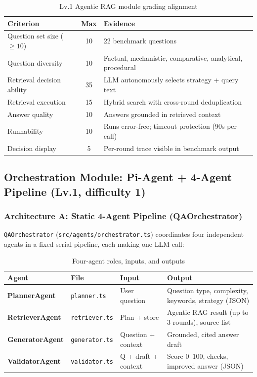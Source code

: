 \documentclass[12pt, a4paper]{article}
\begin{document}
\begin{table}[ht]
\centering
\caption{Lv.1 Agentic RAG module grading alignment}
\begin{tabular}{lcp{7cm}}
\toprule
\textbf{Criterion} & \textbf{Max} & \textbf{Evidence} \\
\midrule
Question set size ($\ge10$) & 10 & 22 benchmark questions \\
Question diversity          & 10 & Factual, mechanistic, comparative, analytical, procedural \\
Retrieval decision ability  & 35 & LLM autonomously selects strategy + query text \\
Retrieval execution         & 15 & Hybrid search with cross-round deduplication \\
Answer quality              & 10 & Answers grounded in retrieved context \\
Runnability                 & 10 & Runs error-free; timeout protection (90s per call) \\
Decision display            &  5 & Per-round trace visible in benchmark output \\
\bottomrule
\end{tabular}
\end{table}

\subsection{Orchestration Module: Pi-Agent + 4-Agent Pipeline (Lv.1, difficulty 1)}

\subsubsection{Architecture A: Static 4-Agent Pipeline (QAOrchestrator)}

\texttt{QAOrchestrator} (\texttt{src/agents/orchestrator.ts}) coordinates four
independent agents in a fixed serial pipeline, each making one LLM call:

\begin{table}[ht]
\centering
\caption{Four-agent roles, inputs, and outputs}
\begin{tabularx}{\textwidth}{llXX}
\toprule
\textbf{Agent} & \textbf{File} & \textbf{Input} & \textbf{Output} \\
\midrule
\textbf{PlannerAgent}   & \texttt{planner.ts}   & User question & Question type, complexity, keywords, strategy (JSON) \\
\textbf{RetrieverAgent} & \texttt{retriever.ts} & Plan + store & Agentic RAG result (up to 3 rounds), source list \\
\textbf{GeneratorAgent} & \texttt{generator.ts} & Question + context & Grounded, cited answer draft \\
\textbf{ValidatorAgent} & \texttt{validator.ts} & Q + draft + context & Score 0--100, checks, improved answer (JSON) \\
\bottomrule
\end{tabularx}
\end{table}
\end{document}
